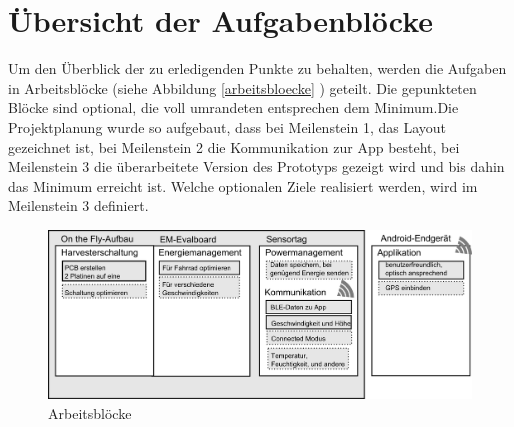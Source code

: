 \section{Übersicht der Aufgabenblöcke}

Um den Überblick der zu erledigenden Punkte zu behalten, werden die Aufgaben in Arbeitsblöcke (siehe Abbildung \ref{arbeitsbloecke} ) geteilt. Die gepunkteten Blöcke sind optional, die voll umrandeten entsprechen dem Minimum.Die Projektplanung wurde so aufgebaut, dass bei Meilenstein 1, das Layout gezeichnet ist, bei Meilenstein 2 die Kommunikation zur App besteht, bei Meilenstein 3 die überarbeitete Version des Prototyps gezeigt wird und bis dahin das Minimum erreicht ist. Welche optionalen Ziele realisiert werden, wird im Meilenstein 3 definiert.

\begin{figure}[ht]
    \includegraphics[width=1.0\textwidth]{../ressources/Projektorganisation/Arbeitsbloecke.png} 
    \caption{Arbeitsblöcke}
\end{figure}\label{arbeitsbloecke} 

